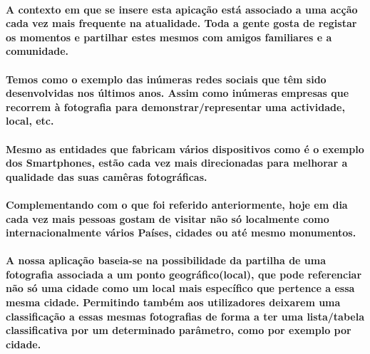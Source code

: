 \paragraph{
A  contexto em que se insere esta apicação está associado a uma acção cada vez mais frequente na atualidade. Toda a gente gosta de registar os momentos e partilhar estes mesmos com amigos familiares e a comunidade.
}
\paragraph{
Temos como o exemplo das inúmeras redes sociais que têm sido desenvolvidas nos últimos anos. Assim como inúmeras empresas que recorrem à fotografia para demonstrar/representar uma actividade, local, etc.
}
\paragraph{
Mesmo as entidades que fabricam vários dispositivos como é o exemplo dos Smartphones, estão cada vez mais direcionadas para melhorar a qualidade das suas camêras fotográficas.
}
\paragraph{
Complementando com o que foi referido anteriormente, hoje em dia cada vez mais pessoas gostam de visitar não só localmente como internacionalmente vários Países, cidades ou até mesmo monumentos.
}
\paragraph{
A nossa aplicação baseia-se na possibilidade da partilha de uma fotografia associada a um ponto geográfico(local), que pode referenciar não só uma cidade como um local mais específico que pertence a essa mesma cidade. Permitindo também aos utilizadores deixarem uma classificação a essas mesmas fotografias de forma a ter uma lista/tabela classificativa por um determinado parâmetro, como por exemplo por cidade.
}